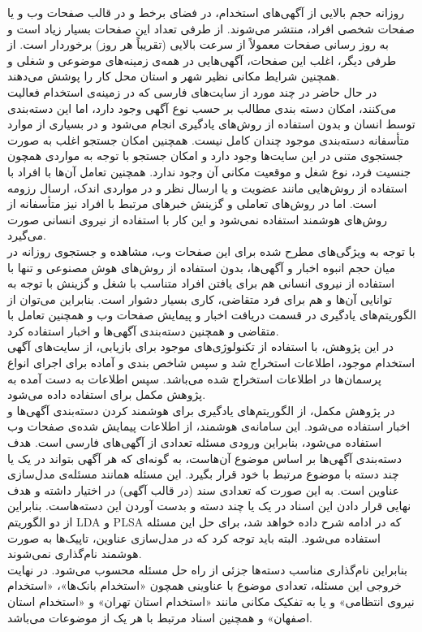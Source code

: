
روزانه حجم بالایی از آگهی‌های استخدام، در فضای برخط و در قالب صفحات وب و یا صفحات شخصی افراد، منتشر می‌شوند. از طرفی تعداد این صفحات بسیار زیاد است و به روز رسانی صفحات معمولاً از سرعت بالایی (تقریباً هر روز) برخوردار است. از طرفی دیگر، اغلب این صفحات، آگهی‌هایی در همه‌ی زمینه‌های موضوعی و شغلی و همچنین شرایط مکانی نظیر شهر و استان محل کار را پوشش می‌دهند.
\\
در حال حاضر در چند مورد از سایت‌های فارسی که در زمینه‌ی استخدام فعالیت می‌کنند، امکان دسته بندی مطالب بر حسب نوع آگهی وجود دارد، اما این دسته‌بندی توسط انسان و بدون استفاده از روش‌های یادگیری انجام می‌شود و در بسیاری از موارد متأسفانه دسته‌بندی موجود چندان کامل نیست. همچنین امکان جستجو اغلب به صورت جستجوی متنی در این سایت‌ها وجود دارد و امکان جستجو با توجه به مواردی همچون جنسیت فرد، نوع شغل و موقعیت مکانی آن وجود ندارد. همچنین تعامل آن‌ها با افراد با استفاده از روش‌هایی مانند عضویت و یا ارسال نظر و در مواردی اندک، ارسال رزومه است. اما در روش‌های تعاملی و گزینش خبرهای مرتبط با افراد نیز متأسفانه از روش‌های هوشمند استفاده نمی‌شود و این کار با استفاده از نیروی انسانی صورت می‌گیرد.
\\
با توجه به ویژگی‌های مطرح شده برای این صفحات وب، مشاهده و جستجوی روزانه در میان حجم انبوه اخبار و آگهی‌ها، بدون استفاده از روش‌های هوش مصنوعی و تنها با استفاده از نیروی انسانی هم برای یافتن افراد متناسب با شغل و گزینش با توجه به توانایی آن‌ها و هم برای فرد متقاضی، کاری بسیار دشوار است. بنابراین می‌توان از الگوریتم‌های یادگیری در قسمت دریافت اخبار و پیمایش صفحات وب و همچنین تعامل با متقاضی و همچنین دسته‌بندی آگهی‌ها و اخبار استفاده کرد.
\\
در این پژوهش، با استفاده از تکنولوژی‌های موجود برای بازیابی، از سایت‌های آگهی استخدام موجود، اطلاعات استخراج شد و سپس شاخص بندی و آماده برای اجرای انواع پرسمان‌ها در اطلاعات استخراج شده می‌باشد. سپس اطلاعات به دست آمده به پژوهش مکمل برای استفاده داده می‌شود.
\\
در پژوهش مکمل، از الگوریتم‌های یادگیری برای هوشمند کردن دسته‌بندی آگهی‌ها و اخبار استفاده می‌شود. این سامانه‌ی هوشمند، از اطلاعات پیمایش شده‌ی صفحات وب استفاده می‌شود، بنابراین ورودی مسئله تعدادی از آگهی‌های فارسی است. هدف دسته‌بندی آگهی‌ها بر اساس موضوع آن‌هاست، به گونه‌ای که هر آگهی بتواند در یک یا چند دسته با موضوع مرتبط با خود قرار بگیرد. این مسئله همانند مسئله‌ی مدل‌سازی عناوین است. به این صورت که تعدادی سند (در قالب آگهی) در اختیار داشته و هدف نهایی قرار دادن این اسناد در یک یا چند دسته و بدست آوردن این دسته‌هاست. بنابراین از دو الگوریتم LDA و PLSA که در ادامه شرح داده خواهد شد، برای حل این مسئله استفاده می‌شود. البته باید توجه کرد که در مدل‌سازی عناوین، تاپیک‌ها به صورت هوشمند نام‌گذاری نمی‌شوند. 
\\
بنابراین نام‌گذاری مناسب دسته‌ها جزئی از راه حل مسئله محسوب می‌شود. در نهایت خروجی این مسئله، تعدادی موضوع با عناوینی همچون «استخدام بانک‌ها»، «استخدام نیروی انتظامی» و یا به تفکیک مکانی مانند «استخدام استان تهران» و «استخدام استان اصفهان» و همچنین اسناد مرتبط با هر یک از موضوعات می‌باشد.


